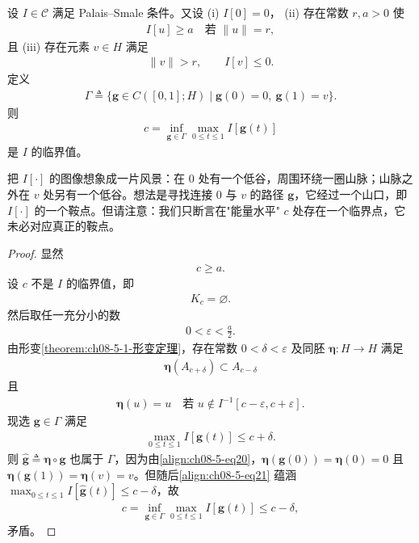 \documentclass[../../main.tex]{subfiles}
\begin{document}
\begin{theorem}[山路定理]\label{theorem:ch08-5-2-山路定理}
设 $I\in\mathcal{C}$ 满足 Palais--Smale 条件。又设
(i) $I[0]=0$，
(ii) 存在常数 $r,a>0$ 使
\begin{align*}
I[u]\geqslant a\quad\text{若 }\|u\|=r,
\end{align*}
且
(iii) 存在元素 $v\in H$ 满足
\begin{align*}
\|v\|>r,\qquad I[v]\leqslant 0.
\end{align*}
定义
\begin{align*}
\Gamma\triangleq\{\mathbf{g}\in C([0,1];H)\mid \mathbf{g}(0)=0,\ \mathbf{g}(1)=v\}.
\end{align*}
则
\begin{align*}
c=\inf_{\mathbf{g}\in\Gamma}\max_{0\leqslant t\leqslant 1}I[\mathbf{g}(t)]
\end{align*}
是 $I$ 的临界值。

把 $I[\cdot]$ 的图像想象成一片风景：在 $0$ 处有一个低谷，周围环绕一圈山脉；山脉之外在 $v$ 处另有一个低谷。想法是寻找连接 $0$ 与 $v$ 的路径 $\mathbf{g}$，它经过一个山口，即 $I[\cdot]$ 的一个鞍点。但请注意：我们只断言在"能量水平" $c$ 处存在一个临界点，它未必对应真正的鞍点。
\begin{proof}
显然
\begin{align}
c\geqslant a.\label{align:ch08-5-eq16}
\end{align}
设 $c$ 不是 $I$ 的临界值，即
\begin{align}
K_c=\varnothing .\label{align:ch08-5-eq17}
\end{align}
然后取任一充分小的数
\begin{align}
0<\varepsilon<\frac a2.\label{align:ch08-5-eq18}
\end{align}
由形变\cref{theorem:ch08-5-1-形变定理}，存在常数 $0<\delta<\varepsilon$ 及同胚 $\boldsymbol{\eta}:H\to H$ 满足
\begin{align}
\boldsymbol{\eta}(A_{c+\delta})\subset A_{c-\delta}\label{align:ch08-5-eq19}
\end{align}
且
\begin{align}
\boldsymbol{\eta}(u)=u\quad\text{若 }u\notin I^{-1}[c-\varepsilon,c+\varepsilon].\label{align:ch08-5-eq20}
\end{align}
现选 $\mathbf{g}\in\Gamma$ 满足
\begin{align}
\max_{0\leqslant t\leqslant 1}I[\mathbf{g}(t)]\leqslant c+\delta.\label{align:ch08-5-eq21}
\end{align}
则 $\widehat{\mathbf{g}}\triangleq\boldsymbol{\eta}\circ\mathbf{g}$ 也属于 $\Gamma$，因为由\eqref{align:ch08-5-eq20}，$\boldsymbol{\eta}(\mathbf{g}(0))=\boldsymbol{\eta}(0)=0$ 且 $\boldsymbol{\eta}(\mathbf{g}(1))=\boldsymbol{\eta}(v)=v$。但随后\eqref{align:ch08-5-eq21} 蕴涵 $\max_{0\leqslant t\leqslant 1}I[\widehat{\mathbf{g}}(t)]\leqslant c-\delta$，故
\begin{align*}
c=\inf_{\mathbf{g}\in\Gamma}\max_{0\leqslant t\leqslant 1}I[\mathbf{g}(t)]\leqslant c-\delta,
\end{align*}
矛盾。
\end{proof}
\end{theorem}
\end{document}
